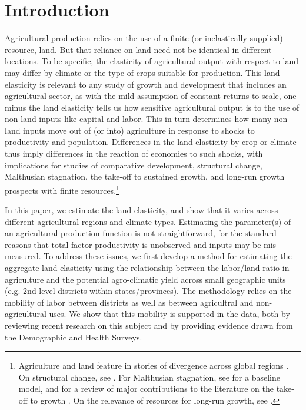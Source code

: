 \documentclass[11pt]{article}
\begin{document}
\pagebreak 

\section{Introduction}
\onehalfspacing 
Agricultural production relies on the use of a finite (or inelastically supplied) resource, land. But that reliance on land need not be identical in different locations. To be specific, the elasticity of agricultural output with respect to land may differ by climate or the type of crops suitable for production. This land elasticity is relevant to any study of growth and development that includes an agricultural sector, as with the mild assumption of constant returns to scale, one minus the land elasticity tells us how sensitive agricultural output is to the use of non-land inputs like capital and labor. This in turn determines how many non-land inputs move out of (or into) agriculture in response to shocks to productivity and population. Differences in the land elasticity by crop or climate thus imply differences in the reaction of economies to such shocks, with implications for studies of comparative development, structural change, Malthusian stagnation, the take-off to sustained growth, and long-run growth prospects with finite resources.\footnote{Agriculture and land feature in stories of divergence across global regions \citep{kp2001,galor2008trading,vollrath2011,vv08,vv13,cs2015}. On structural change, see \cite{Gollin:2007oq,Restuccia:2008hc,weilwilde2009,Gollin:2010ys,ev2016clim}. For Malthusian stagnation, see \cite{ashraf2010dynamics} for a baseline model, and \citet{Galor:2011uq} for a review of major contributions to the literature on the take-off to growth \citep{gw00,galor2002natural,Hansen:2002fk,doepke2004accounting,cs2005,lagerlof2006,craftsmills2009,strulik2008population}. On the relevance of resources for long-run growth, see \cite{perettovalente2015}.} 

In this paper, we estimate the land elasticity, and show that it varies across different agricultural regions and climate types. Estimating the parameter(s) of an agricultural production function is not straightforward, for the standard reasons that total factor productivity is unobserved and inputs may be mis-measured. To address these issues, we first develop a method for estimating the aggregate land elasticity using the relationship between the labor/land ratio in agriculture and the potential agro-climatic yield across small geographic units (e.g. 2nd-level districts within states/provinces). The methodology relies on the mobility of labor between districts as well as between agricultral and non-agricultural uses. We show that this mobility is supported in the data, both by reviewing recent research on this subject and by providing evidence drawn from the Demographic and Health Surveys.
\end{document}
